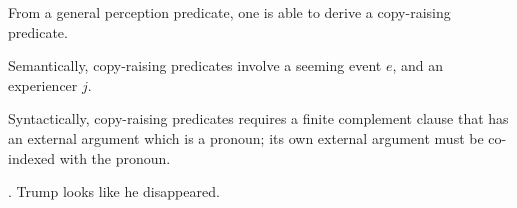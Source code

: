 \documentclass[11pt]{article}
\begin{document}

From a general perception predicate, one is able to derive a copy-raising predicate.

Semantically, copy-raising predicates involve a seeming event \(e\), and an experiencer \(j\).

Syntactically, copy-raising predicates requires a finite complement clause that has an external argument which is a pronoun; its own external argument must be co-indexed with the pronoun.

\ex. Trump looks like he disappeared.
\end{document}
